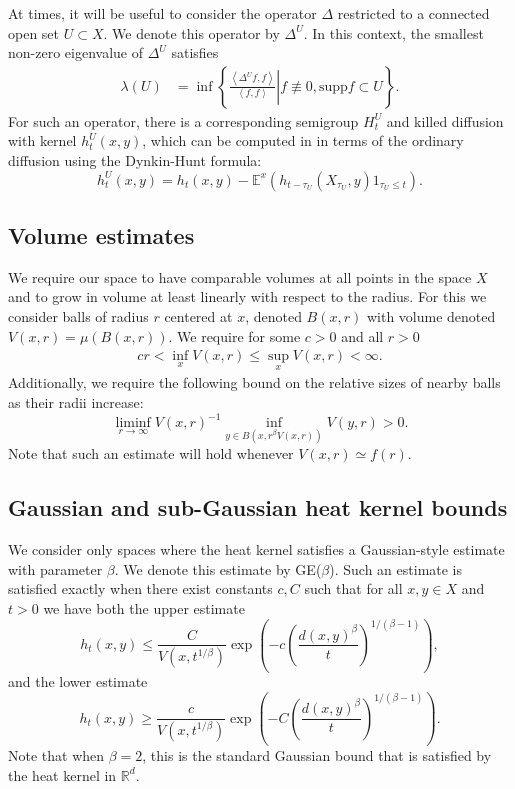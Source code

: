 \documentclass[letterpaper,oneside,english]{amsart}
\begin{document}
At times, it will be useful to consider the operator $\Delta$ restricted to a connected open set $U \subset X$.  We denote this operator by $\Delta^U$.  In this context, the
smallest non-zero eigenvalue of $\Delta^{U}$ satisfies
\begin{align}
\lambda(U) & 
=\inf\left\{ \left.
\frac{\left\langle \Delta^{U}f,f\right \rangle}{\left\langle f,f\right\rangle}
\right|f\not\equiv0,\mathrm{supp}f\subset U\right\}. \nonumber 
\label{eq:eigenvalue}\end{align}
For such an operator, there is a corresponding semigroup $H_t^U$ and killed diffusion with kernel $h^U_t(x,y)$, which can be computed in in terms of the ordinary diffusion using the Dynkin-Hunt formula:
\[
h_t^{U}(x,y)=h_t(x,y) -\mathbb{E}^x(h_{t-\tau_U}(X_{\tau_U},y)1_{\tau_U\le t}).
\]

\subsection{Volume estimates} \label{Volume} We require our space to have comparable volumes at all points in the space $X$ and to grow in volume at least linearly with respect to the radius.  For this we consider balls of radius $r$ centered at $x$, denoted $B(x,r)$ with volume denoted $V(x,r) = \mu(B(x,r))$.  We require for some $c>0$ and all $r>0$
\begin{eqnarray}
cr < \inf_x V(x,r) \le \sup_x V(x,r) < \infty .\label{gb1}
\end{eqnarray}
Additionally, we require the following bound on the relative sizes of nearby balls as their radii increase:
\begin{equation}
\liminf_{r\to\infty}V(x,r)^{-1}\inf_{y\in B\left(x,r^{\beta}V(x,r)\right)}V(y,r)>0 .\label{eq:volcondbeta}\end{equation}
Note that such an estimate will hold whenever $V(x,r)\simeq f(r)$.

\subsection{Gaussian and sub-Gaussian heat kernel bounds} \label{Gaussian} We consider only spaces where the heat kernel satisfies a Gaussian-style estimate with parameter $\beta$.  We denote this estimate by GE($\beta$).  Such an estimate is satisfied exactly when there exist constants $c, C$ such that for all $x,y\in X$ and $t>0$ we have both the upper estimate \begin{equation}
  h_{t}(x,y)\le\frac{C}{V\left(x,t^{1/\beta}\right)}\exp\left(-c\left(\frac{d(x,y)^{\beta}}{t}\right)^{1/(\beta-1)}\right),\label{eq:GUE}\end{equation}
and the lower estimate\begin{equation}
  h_t(x,y)\ge\frac{c}{V\left(x,t^{1/\beta}\right)}\exp\left(-C\left(\frac{d(x,y)^{\beta}}{t}\right)^{1/(\beta-1)}\right).\label{eq:GLE}\end{equation}
Note that when $\beta=2$, this is the standard Gaussian bound that is satisfied by the heat kernel in ${\mathbb{R}}^d$.  
\end{document}
